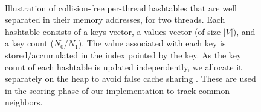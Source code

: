 \begin{figure}[hbtp]
  \centering
   \\[-2ex]
  \caption{Illustration of collision-free per-thread hashtables that are well separated in their memory addresses, for two threads. Each hashtable consists of a keys vector, a values vector (of size $|V|$), and a key count ($N_0$/$N_1$). The value associated with each key is stored/accumulated in the index pointed by the key. As the key count of each hashtable is updated independently, we allocate it separately on the heap to avoid false cache sharing \cite{sahu2023gvelouvain}. These are used in the scoring phase of our implementation to track common neighbors.}
  \label{fig:about-hashtable}
\end{figure}
